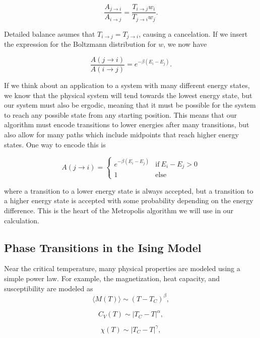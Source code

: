 \documentclass[%
oneside,                 %
final,                   %
10pt]{article}
\begin{document}
\begin{equation*}
\frac{A_{j \rightarrow i}}{A_{i \rightarrow j}}=\frac{T_{i \rightarrow j}w_i}{ T_{j \rightarrow i}w_j}.
\end{equation*}

Detailed balance asumes that $T_{i \rightarrow j}=T_{j \rightarrow i}$, causing a cancelation.  If we insert the expression for the Boltzmann distribution for $w$, we now have

\begin{equation*}
\frac{A(j \rightarrow i)}{A(i \rightarrow j)}=e^{-\beta (E_i-E_j)}.
\end{equation*}

If we think about an application to a system with many different energy states, we know that the physical system will tend towards the lowest energy state, but our system must also be ergodic, meaning that it must be possible for the system to reach any possible state from any starting position.  This means that our algorithm must encode transitions to lower energies after many transitions, but also allow for many paths which include midpoints that reach higher energy states.  One way to encode this is

\begin{equation*}
A(j \rightarrow i) = \begin{cases}
e^{-\beta(E_i-E_j)} & \text{if} \ E_i-E_j > 0 \\
1 & \text{else}
\end{cases}
\end{equation*}

where a transition to a lower energy state is always accepted, but a transition to a higher energy state is accepted with some probability depending on the energy difference.  This is the heart of the Metropolis algorithm we will use in our calculation.

\subsection{Phase Transitions in the Ising Model}

Near the critical temperature, many physical properties are modeled using a simple power law.  For example, the magnetization, heat capacity, and susceptibility are modeled as 
\[
  \langle M(T) \rangle \sim \left(T-T_C\right)^{\beta},
\]

\[
  C_V(T) \sim \left|T_C-T\right|^{\alpha},
\]

\[
  \chi(T) \sim \left|T_C-T\right|^{\gamma},
\]
\end{document}
